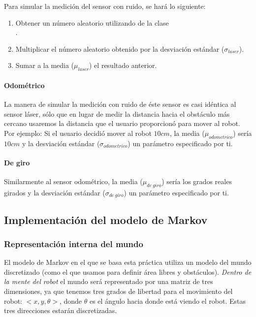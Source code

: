 Para simular la medición del sensor con ruido, se hará lo siguiente:

\begin{enumerate}
  \item Obtener un número aleatorio utilizando  de la clase\\ .
  \item Multiplicar el número aleatorio obtenido por la desviación estándar (\( \sigma_{laser} \)).
  \item Sumar a la media (\( \mu_{laser} \)) el resultado anterior.
\end{enumerate}


\paragraph{Odométrico}\medskip
La manera de simular la medición con ruido de éste sensor es casi idéntica al sensor láser, sólo que en lugar de medir la distancia hacia el obstáculo más cercano usaremos la distancia que el usuario proporcionó para mover al robot. Por ejemplo: Si el usuario decidió mover al robot \(10cm\), la media (\( \mu_{odometrico} \)) sería \(10cm\) y la desviación estándar (\( \sigma_{odometrico} \)) un parámetro especificado por ti.


\paragraph{De giro}\medskip
Similarmente al sensor odométrico, la media (\( \mu_{de\ giro} \)) sería los grados reales girados y la desviación estándar (\( \sigma_{de\ giro} \)) un parámetro especificado por ti.

\subsection{Implementación del modelo de Markov}

\subsubsection{Representación interna del mundo}\medskip

El modelo de Markov en el que se basa esta práctica utiliza un modelo del mundo discretizado (como el que usamos para definir área libres y obstáculos). \textit{Dentro de la mente del robot} el mundo será representado por una matriz de tres dimensiones, ya que tenemos tres grados de libertad para el movimiento del robot: \(<x,y,\theta>\), donde \( \theta \) es el ángulo hacia donde está viendo el robot. Estas tres direcciones estarán discretizadas.\par

